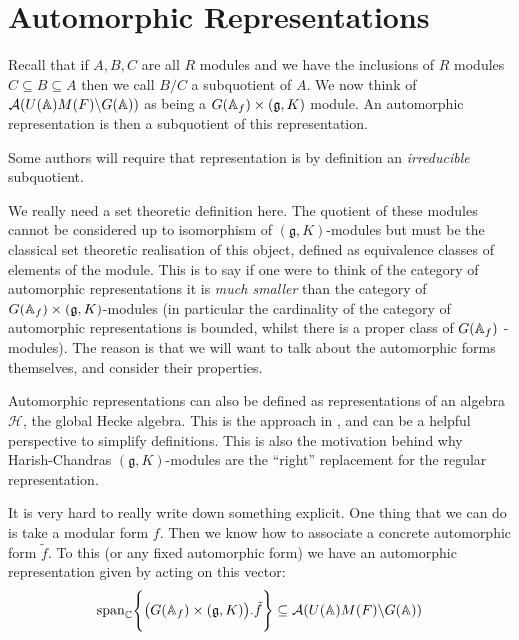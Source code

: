 \section{Automorphic Representations}
Recall that if \(A, B, C\) are all \(R\) modules and we have the inclusions of \(R\) modules \(C \subseteq B \subseteq A\) then we call \(B/C\) a subquotient of \(A\). We now think of \(\mathcal{A}(U(\A)M(F)\backslash G(\A))\) as being a \(G(\A_f)\times (\mathfrak{g}, K)\) module. An automorphic representation is then a subquotient of this representation.
\begin{remark}
    Some authors will require that representation is by definition an \textit{irreducible} subquotient.
\end{remark}
\begin{remark}
    We really need a set theoretic definition here. The quotient of these modules cannot be considered up to isomorphism of \((\mathfrak{g}, K)\)-modules but must be the classical set theoretic realisation of this object, defined as equivalence classes of elements of the module. This is to say if one were to think of the category of automorphic representations it is \textit{much smaller} than the category of \(G(\A_f)\times (\mathfrak{g}, K)\)-modules (in particular the cardinality of the category of automorphic representations is bounded, whilst there is a proper class of \(G(\A_f)\) -modules). The reason is that we will want to talk about the automorphic forms themselves, and consider their properties.
\end{remark}

\begin{remark}
    Automorphic representations can also be defined as representations of an algebra \(\mathcal{H}\), the global Hecke algebra. This is the approach in \cite[I.II(4.6)]{borelAutomorphicFormsRepresentations1979}, and can be a helpful perspective to simplify definitions. This is also the motivation behind why Harish-Chandras \((\mathfrak{g}, K)\)-modules are the ``right'' replacement for the regular representation. 
\end{remark}

\begin{example}
    It is very hard to really write down something explicit. One thing that we can do is take a modular form \(f\). Then we know how to associate a concrete automorphic form \(\tilde{f}\). To this (or any fixed automorphic form) we have an automorphic representation given by acting on this vector:
    \[\mathrm{span}_\C \Biggl\{\big(G(\A_f)\times (\mathfrak{g}, K)\big).\tilde{f}\Biggr\} \subseteq \mathcal{A}(U(\A)M(F)\backslash G(\A))\]
\end{example}

